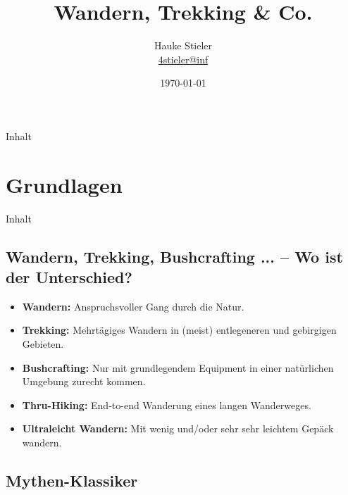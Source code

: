 \documentclass{beamer}
\author[Hauke Stieler]{Hauke Stieler\\\href{mailto:4stieler@informatik.uni-hamburg.de}{4stieler@inf}}
\title{Wandern, Trekking \& Co.}
\date{\today}
\begin{document}
	{
		\maketitle
		\addtocounter{page}{-1}
	}
	
	\begin{frame}[t]{Inhalt}
	\tableofcontents[hidesubsections]
	\end{frame}
	
	\section{Grundlagen}
		
		\begin{frame}[t]{Inhalt}
		\end{frame}
	
		\subsection{Wandern, Trekking, Bushcrafting ... -- Wo ist der Unterschied?}
		
			\begin{frame}{}
				\begin{itemize}
					\item \textbf{Wandern:} Anspruchsvoller Gang durch die Natur.\pause
					\item \textbf{Trekking:} Mehrtägiges Wandern in (meist) entlegeneren und gebirgigen Gebieten.\pause
					\item \textbf{Bushcrafting:} Nur mit grundlegendem Equipment in einer natürlichen Umgebung zurecht kommen.\pause
					\item \textbf{Thru-Hiking:} End-to-end Wanderung eines langen Wanderweges.\pause
					\item \textbf{Ultraleicht Wandern:} Mit wenig und/oder sehr sehr leichtem Gepäck wandern.
				\end{itemize}
			\end{frame}
		
		\subsection{Mythen-Klassiker}
			
\end{document}
